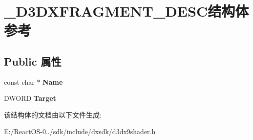 \hypertarget{struct___d3_d_x_f_r_a_g_m_e_n_t___d_e_s_c}{}\section{\+\_\+\+D3\+D\+X\+F\+R\+A\+G\+M\+E\+N\+T\+\_\+\+D\+E\+S\+C结构体 参考}
\label{struct___d3_d_x_f_r_a_g_m_e_n_t___d_e_s_c}
\subsection*{Public 属性}
\begin{DoxyCompactItemize}
\item 
\mbox{\label{struct___d3_d_x_f_r_a_g_m_e_n_t___d_e_s_c_a6eb08d35db62a2636e6ce8ee975d4b06}} 
const char $\ast$ {\bfseries Name}
\item 
\mbox{\label{struct___d3_d_x_f_r_a_g_m_e_n_t___d_e_s_c_a9bb6eee8bcc9bb4c7edd1eacd97f9bd7}} 
D\+W\+O\+RD {\bfseries Target}
\end{DoxyCompactItemize}


该结构体的文档由以下文件生成\+:\begin{DoxyCompactItemize}
\item 
E\+:/\+React\+O\+S-\/0../sdk/include/dxsdk/d3dx9shader.\+h\end{DoxyCompactItemize}
